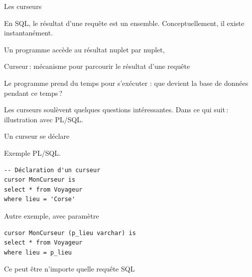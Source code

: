 
\begin{frame}[fragile]{Les curseurs}

En SQL, le résultat d'une requête est un \alert{ensemble}. Conceptuellement,
il existe instantanément.

\vfill

Un programme accède au résultat nuplet par nuplet,

\vfill


\alert{Curseur}\,: mécanisme  pour parcourir le résultat d'une requête

\vfill


Le programme prend du temps pour s'exécuter : que devient la base de données pendant ce temps\,?

\vfill

Les curseurs soulèvent quelques questions intéressantes. 
Dans ce qui suit\,: illustration avec PL/SQL.

\end{frame}


\begin{frame}[fragile]{Un curseur se déclare}

Exemple PL/SQL.

\vfill

\begin{small}
\begin{verbatim}
-- Déclaration d'un curseur
cursor MonCurseur is
select * from Voyageur
where lieu = 'Corse'
\end{verbatim}
\end{small}

\vfill

Autre exemple, avec paramètre

\vfill

\begin{small}
\begin{verbatim}
cursor MonCurseur (p_lieu varchar) is
select * from Voyageur
where lieu = p_lieu
\end{verbatim}
\end{small}
\vfill

Ce peut être n'importe quelle requête SQL
\end{frame}

